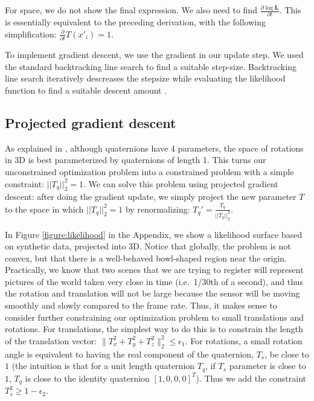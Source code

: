 \documentclass{article} %
\begin{document}
For space, we do not show the final expression. We also need to find $\frac{\partial \log \mathbf{L}}{\partial t}$. This is essentially
equivalent to the preceding derivation, with the following simplification: $\frac{\partial }{\partial t} T(x'_i) = 1$.

To implement gradient descent, we use the gradient in our update step. We used the standard backtracking line search to find a suitable step-size. Backtracking line search iteratively descreases the stepsize while evaluating the likelihood function to find a suitable descent amount \cite[p. 464]{boyd2004convex}.

\subsection{Projected gradient descent}
\label{sec:interm}
As explained in \cite{wheeler1995}, although quaternions have 4 parameters, the space of rotations in 3D is best parameterized by quaternions of length 1. This turns our unconstrained optimization problem into a constrained problem with a simple constraint: $||T_q||^2_2 = 1$. We can solve this problem using projected gradient descent: after doing the gradient update, we simply project the new parameter $T$ to the space in which $||T_q||^2_2 = 1$
by renormalizing: $T_q' = \frac{T_q}{||T_q||^2_2}$.

In Figure \ref{figure:likelihood} in the Appendix, we show a likelihood surface based on synthetic data, projected into 3D. Notice that globally, the problem is not convex, but that there is a well-behaved bowl-shaped region near the origin. Practically, we know that two scenes that we are trying to register will represent pictures of the world taken very close in time (i.e.~1/30th of a second), and thus the rotation and translation will not be large because the sensor will be moving smoothly and slowly compared to the frame rate. Thus, it makes sense to consider further constraining our optimization problem to small translations and rotations. For translations, the simplest way to do this is to constrain the length of the translation vector: $\|T_x^2 + T_y^2 + T_z^2\|^2_2 \leq \epsilon_1$. For rotations, a small rotation angle is equivalent to having the real component of the quaternion, $T_s$, be close to $1$ \cite{wheeler1995} (the intuition is that for a unit length quaternion $T_q$, if $T_s$ parameter is close to $1$, $T_q$ is close to the identity quaternion $[1, 0, 0, 0]^T$). Thus we add the constraint $T_s^2 \geq 1-\epsilon_2$.
\end{document}
